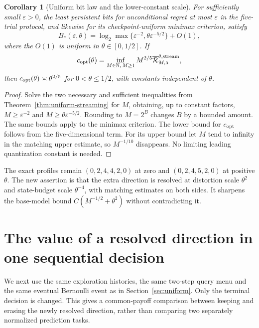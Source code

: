\documentclass[11pt]{amsart}
\newtheorem{corollary}[theorem]{Corollary}
\theoremstyle{definition}\newtheorem{definition}[theorem]{Definition}
\theoremstyle{remark}\newtheorem{remark}[theorem]{Remark}
\begin{document}
\begin{corollary}[Uniform bit law and the lower-constant scale]\label{cor:uniform-bits}
For sufficiently small $\varepsilon>0$, the least persistent bits for
unconditional regret at most $\varepsilon$ in the five-trial protocol,
and likewise for its checkpoint-uniform minimax criterion, satisfy
\begin{equation}\label{eq:uniform-bits}
 B_*(\varepsilon,\theta)
   =\log_2\max\{\varepsilon^{-2},\theta\varepsilon^{-5/2}\}+O(1),
\end{equation}
where the $O(1)$ is uniform in $\theta\in[0,1/2]$. If
\[
 c_{\rm opt}(\theta)=\inf_{M\in\mathbb N,\,M\ge1}
           M^{2/5}\overline{\mathcal R}_{M,5}^{\theta,\mathrm{stream}},
\]
then $c_{\rm opt}(\theta)\asymp\theta^{2/5}$ for $0<\theta\le1/2$,
with constants independent of $\theta$.
\end{corollary}
\begin{proof}
Solve the two necessary and sufficient inequalities from
Theorem~\ref{thm:uniform-streaming} for $M$, obtaining, up to constant
factors, $M\ge\varepsilon^{-2}$ and $M\ge\theta\varepsilon^{-5/2}$.
Rounding to $M=2^B$ changes $B$ by a bounded amount. The same bounds
apply to the minimax criterion. The lower bound for $c_{\rm opt}$ follows
from the five-dimensional term. For its upper bound let $M$ tend to
infinity in the matching upper estimate, so
$M^{-1/10}$ disappears. No limiting leading quantization constant is
needed.
\end{proof}

The exact profiles remain $(0,2,4,4,2,0)$ at zero and
$(0,2,4,5,2,0)$ at positive $\theta$. The new assertion is that the extra
direction is resolved at distortion scale $\theta^2$ and state-budget
scale $\theta^{-4}$, with matching estimates on both sides. It sharpens
the base-model bound $C(M^{-1/2}+\theta^2)$ without contradicting it.

\section{The value of a resolved direction in one sequential decision}\label{sec:resolved-value}
We next use the same exploration histories, the same two-step query menu
and the same eventual Bernoulli event as in Section~\ref{sec:uniform}.
Only the terminal decision is changed. This gives a common-payoff
comparison between keeping and erasing the newly resolved direction,
rather than comparing two separately normalized prediction tasks.
\end{document}
